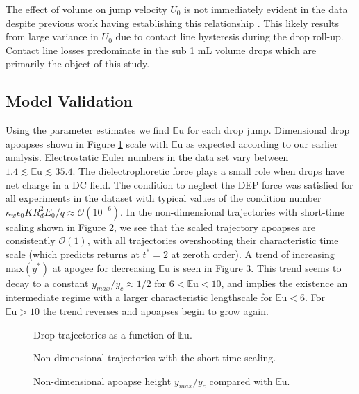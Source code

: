\documentclass[aip,reprint, floatfix]{revtex4-1}
\begin{document}
The effect of volume on jump velocity $U_0$ is not immediately evident in the data despite previous work having establishing this relationship \cite{attari_puddle_2016}. This likely results from large variance in $U_0$ due to contact line hysteresis during the drop roll-up. Contact line losses predominate in the sub 1 mL volume drops which are primarily the object of this study.  

\subsection{Model Validation}
Using the parameter estimates we find $\mathbb{E}\mbox{u}$ for each drop jump. Dimensional drop apoapses shown in Figure \ref{fig:series_s_eu} scale with $\mathbb{E}\mbox{u}$ as expected according to our earlier analysis. Electrostatic Euler numbers in the data set vary between $1.4 \lesssim \mathbb{E}\mbox{u} \lesssim 35.4$. \sout{The dielectrophoretic force plays a small role when drops have net charge in a DC field. The condition to neglect the DEP force was satisfied for all experiments in the dataset with typical values of the condition number $\kappa_w \epsilon_0 K R_d^2 E_0/q \approx \mathcal{O}(10^{-6})$}. In the non-dimensional trajectories with short-time scaling shown in Figure \ref{fig:series_s_ds}, we see that the scaled trajectory apoapses are consistently $\mathcal{O}(1)$, with all trajectories overshooting their characteristic time scale (which predicts returns at $t^*  =2$ at zeroth order). A trend of increasing $\mbox{max} \left(y^* \right)$ at apogee for decreasing $\mathbb{E}\mbox{u}$ is seen in Figure \ref{fig:yscale_trend}. This trend seems to decay to a constant $y_{max}/y_c \approx 1/2$ for $6 < \mathbb{E}\mbox{u} < 10$, and implies the existence an intermediate regime with a larger characteristic lengthscale for $\mathbb{E}\mbox{u} < 6$. For $\mathbb{E}\mbox{u} > 10$ the trend reverses and apoapses begin to grow again.
\begin{figure}[!htb]
    \centering
    \resizebox{0.5\textwidth}{!}{}
    \caption{Drop trajectories as a function of $\mathbb{E}\mbox{u}$.\label{fig:series_s_eu}}
\end{figure}
\begin{figure}[htb]
    \centering
    \resizebox{0.5\textwidth}{!}{}
    \caption{Non-dimensional trajectories with the short-time scaling.\label{fig:series_s_ds}}
\end{figure}
\begin{figure}[htb]
    \centering
    \resizebox{0.5\textwidth}{!}{}
    \caption{Non-dimensional apoapse height $y_{max}/y_c$ compared with $\mathbb{E}\mbox{u}$.\label{fig:yscale_trend}}
\end{figure}
\end{document}
